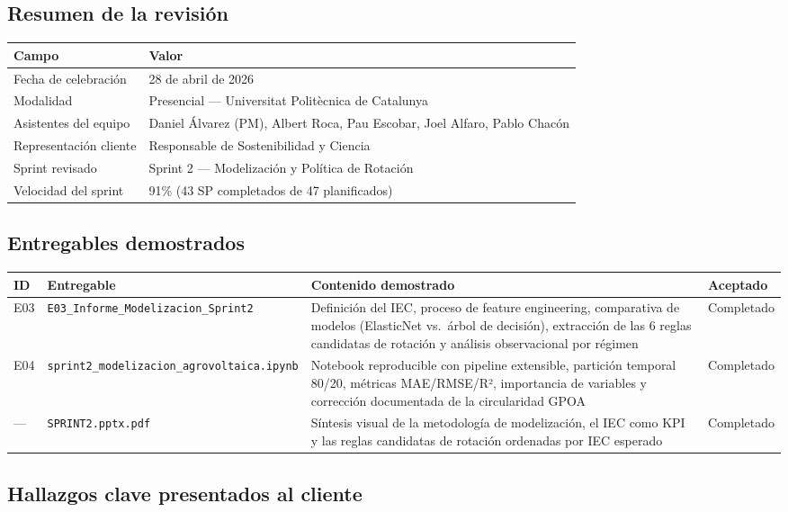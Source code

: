 \documentclass[11pt,a4paper]{article}
\begin{document}
\subsection{Resumen de la revisión}

\begin{longtable}{p{} p{}}
\textbf{Campo} & \textbf{Valor} \\
\hline
Fecha de celebración & 28 de abril de 2026 \\
Modalidad & Presencial — Universitat Politècnica de Catalunya \\
Asistentes del equipo & Daniel Álvarez (PM), Albert Roca, Pau Escobar, Joel Alfaro, Pablo Chacón \\
Representación cliente & Responsable de Sostenibilidad y Ciencia \\
Sprint revisado & Sprint 2 — Modelización y Política de Rotación \\
Velocidad del sprint & 91\% (43 SP completados de 47 planificados) \\
\end{longtable}

\subsection{Entregables demostrados}

\begin{longtable}{p{} p{} p{} p{}}
\textbf{ID} & \textbf{Entregable} & \textbf{Contenido demostrado} & \textbf{Aceptado} \\
\hline
E03 & \texttt{E03\_Informe\_Modelizacion\_Sprint2} & Definición del IEC, proceso de feature engineering, comparativa de modelos (ElasticNet vs.\ árbol de decisión), extracción de las 6 reglas candidatas de rotación y análisis observacional por régimen & Completado \\
E04 & \texttt{sprint2\_modelizacion\_agrovoltaica.ipynb} & Notebook reproducible con pipeline extensible, partición temporal 80/20, métricas MAE/RMSE/R², importancia de variables y corrección documentada de la circularidad GPOA & Completado \\
— & \texttt{SPRINT2.pptx.pdf} & Síntesis visual de la metodología de modelización, el IEC como KPI y las reglas candidatas de rotación ordenadas por IEC esperado & Completado \\
\end{longtable}

\subsection{Hallazgos clave presentados al cliente}
\end{document}
